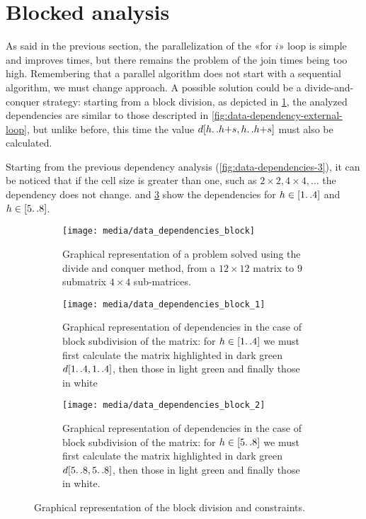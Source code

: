 \section{Blocked analysis}\label{blocked_parallelization}

As said in the previous section, the parallelization of the «for \(i\)» loop is simple and improves times, but there remains the problem of the join times being too high. 
Remembering that a parallel algorithm does not start with a sequential algorithm, we must change approach.
A possible solution could be a divide-and-conquer strategy: starting from a block division, as depicted in \cref{fig:submatrix}, the analyzed dependencies are similar to those descripted in \cref{fig:data-dependency-external-loop}, but unlike before, this time the value \(d[h{\mathinner {\ldotp \ldotp}}h{+}s,h{\mathinner {\ldotp \ldotp}}h{+}s]\) must also be calculated.

Starting from the previous dependency analysis (\cref{fig:data-dependencies-3}), it can be noticed that if the cell size is greater than one, such as  \(  2 \times 2,  4 \times 4, \dots\) the dependency does not change.
 and \ref{fig:data-dependencies-block-2} show the dependencies for \(h \in [1{\mathinner {\ldotp \ldotp}}4]\) and \(h \in [5{\mathinner {\ldotp \ldotp}}8]\).

\begin{figure}[htbp]
    \centering
    \begin{subfigure}[t]{0.3\textwidth}
        \texttt{[image: media/data\_dependencies\_block]}
        \caption{Graphical representation of a problem solved using the divide and conquer method, from a \(12\times 12\) matrix to \(9\) submatrix \(4\times 4\) sub-matrices.}
        \label{fig:submatrix}
    \end{subfigure}
    \hfill
    \begin{subfigure}[t]{0.3\textwidth}
        \texttt{[image: media/data\_dependencies\_block\_1]}
        \caption{Graphical representation of dependencies in the case of block subdivision of the matrix: for \(h \in [1{\mathinner {\ldotp \ldotp}}4]\) we must first calculate the matrix highlighted in dark green \(d[1{\mathinner {\ldotp \ldotp}}4,1{\mathinner {\ldotp \ldotp}}4]\), then those in light green and finally those in white}
        \label{fig:data-dependencies-block-1}
    \end{subfigure}
    \hfill
    \begin{subfigure}[t]{0.3\textwidth}
        \texttt{[image: media/data\_dependencies\_block\_2]}
        \caption{Graphical representation of dependencies in the case of block subdivision of the matrix: for \(h \in [5{\mathinner {\ldotp \ldotp}}8]\) we must first calculate the matrix highlighted in dark green \(d[5{\mathinner {\ldotp \ldotp}}8,5{\mathinner {\ldotp \ldotp}}8]\), then those in light green and finally those in white.}
        \label{fig:data-dependencies-block-2}
    \end{subfigure}
    \caption{Graphical representation of the block division and constraints.}
    \label{fig:data-representation-of-the-block-division-and-constraints}
\end{figure}

